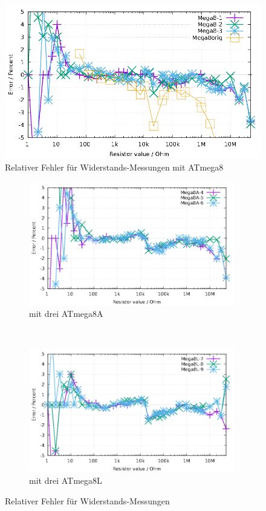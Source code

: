 \begin{figure}[H]
\centering
\includegraphics[width=16cm]{../GNU/Mega8res.pdf}
\caption{Relativer Fehler für Widerstands-Messungen mit ATmega8 }
\label{fig:mega8res}
\end{figure}

\begin{figure}[H]
  \begin{subfigure}[b]{9cm}
    \centering
    \includegraphics[width=9cm]{../GNU/Mega8Ares.pdf}
    \caption{mit drei ATmega8A}
    \label{fig:mega8Ares}
  \end{subfigure}
  ~
  \begin{subfigure}[b]{9cm}
    \centering
    \includegraphics[width=9cm]{../GNU/Mega8Lres.pdf}
    \caption{mit drei ATmega8L}
    \label{fig:mega8Lres}
  \end{subfigure}
\caption{Relativer Fehler für Widerstands-Messungen}
\end{figure}

